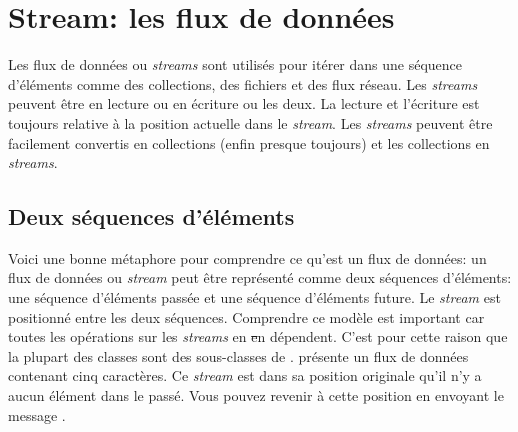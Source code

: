 \documentclass[a4paper,10pt,twoside]{book}
\begin{document}
	\renewcommand{\nnbb}[2]{} %
	\sloppy
\fi
\newcommand{\stream}{\emph{stream}\xspace}
\newcommand{\streams}{\emph{streams}\xspace}
\chapter{Stream: les flux de donn\'ees}\label{cha:streams}

Les flux de donn\'ees ou \streams sont utilis\'es pour it\'erer dans
une s\'equence d'\'el\'ements comme des
collections, des fichiers et des flux r\'eseau.
Les \streams peuvent \^etre en lecture ou en écriture ou les deux.
La lecture et l'\'ecriture est toujours relative \`a la position actuelle
dans le \stream. Les \streams peuvent \^etre facilement convertis en
collections 
(enfin presque toujours)
et les collections en \streams.

\section{Deux s\'equences d'\'el\'ements}
Voici une bonne m\'etaphore pour comprendre ce qu'est un flux de donn\'ees:
un flux de donn\'ees ou \stream peut \^etre repr\'esent\'e comme deux
s\'equences d'\'el\'ements: une s\'equence d'\'el\'ements pass\'ee 
et une s\'equence d'\'el\'ements future.
Le \stream est positionn\'e entre les deux s\'equences.
Comprendre ce mod\`ele est important car toutes les op\'erations
sur les \streams en \st en d\'ependent.
C'est pour cette raison que la plupart des
classes  sont des sous-classes de .
 pr\'esente un flux de donn\'ees contenant cinq caract\`eres.
Ce \stream est dans sa position originale \ie qu'il n'y a aucun \'el\'ement
dans le pass\'e. Vous pouvez revenir \`a cette position en envoyant le 
message 
.
\end{document}
